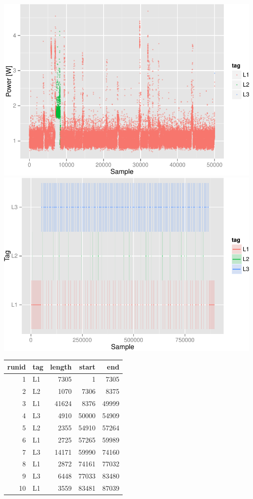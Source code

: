 \documentclass[]{article}
\begin{document}
\includegraphics{AnalysisProcedure_files/figure-latex/denoised-1.pdf}
\includegraphics{AnalysisProcedure_files/figure-latex/denoised-2.pdf}

\begin{longtable}[c]{@{}rlrrr@{}}
\toprule
runid & tag & length & start & end\tabularnewline
\midrule
\endhead
1 & L1 & 7305 & 1 & 7305\tabularnewline
2 & L2 & 1070 & 7306 & 8375\tabularnewline
3 & L1 & 41624 & 8376 & 49999\tabularnewline
4 & L3 & 4910 & 50000 & 54909\tabularnewline
5 & L2 & 2355 & 54910 & 57264\tabularnewline
6 & L1 & 2725 & 57265 & 59989\tabularnewline
7 & L3 & 14171 & 59990 & 74160\tabularnewline
8 & L1 & 2872 & 74161 & 77032\tabularnewline
9 & L3 & 6448 & 77033 & 83480\tabularnewline
10 & L1 & 3559 & 83481 & 87039\tabularnewline
\bottomrule
\end{longtable}
\end{document}
